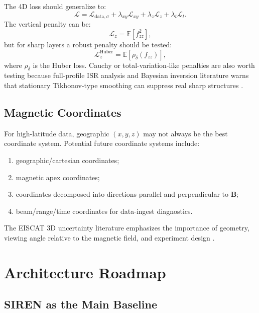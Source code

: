 \documentclass[11pt]{article}
\newcommand{\E}{\mathbb{E}}
\begin{document}
The 4D loss should generalize to:
\begin{equation}
  \mathcal{L}
  =
  \mathcal{L}_{\mathrm{data},\sigma}
  +
  \lambda_{xy}\mathcal{L}_{xy}
  +
  \lambda_z\mathcal{L}_z
  +
  \lambda_t\mathcal{L}_t.
\end{equation}
The vertical penalty can be:
\begin{equation}
  \mathcal{L}_z
  =
  \E[f_{zz}^2],
\end{equation}
but for sharp layers a robust penalty should be tested:
\begin{equation}
  \mathcal{L}_z^{\mathrm{Huber}}
  =
  \E\left[\rho_{\delta}(f_{zz})\right],
\end{equation}
where $\rho_{\delta}$ is the Huber loss. Cauchy or total-variation-like penalties are also worth
testing because full-profile ISR analysis and Bayesian inversion literature warns that stationary
Tikhonov-type smoothing can suppress real sharp structures \cite{Diaz2026ISRError,Hansen1992LCurve}.

\subsection{Magnetic Coordinates}

For high-latitude data, geographic $(x,y,z)$ may not always be the best coordinate system.
Potential future coordinate systems include:
\begin{enumerate}[leftmargin=*]
  \item geographic/cartesian coordinates;
  \item magnetic apex coordinates;
  \item coordinates decomposed into directions parallel and perpendicular to $\mathbf{B}$;
  \item beam/range/time coordinates for data-ingest diagnostics.
\end{enumerate}
The EISCAT 3D uncertainty literature emphasizes the importance of geometry, viewing angle relative
to the magnetic field, and experiment design \cite{Hatch2025E3D}.

\section{Architecture Roadmap}

\subsection{SIREN as the Main Baseline}
\end{document}

